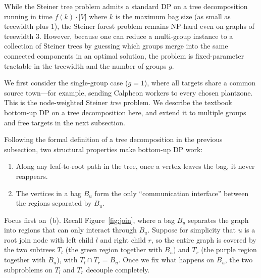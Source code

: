 \documentclass[11pt]{article}
\theoremstyle{definition}
\theoremstyle{remark}
\begin{document}
While the Steiner tree problem admits a standard DP on a tree decomposition running in time $f(k)\cdot |V|$ where $k$ is the maximum bag size (as small as treewidth plus $1$), the Steiner forest problem remains NP-hard even on graphs of treewidth $3$. However, because one can reduce a multi-group instance to a collection of Steiner trees by guessing which groups merge into the same connected components in an optimal solution, the problem is fixed-parameter tractable in the treewidth and the number of groups $g$.

We first consider the single-group case ($g = 1$), where all targets share a common source town---for example, sending Calpheon workers to every chosen plantzone. This is the node-weighted Steiner \textit{tree} problem. We describe the textbook bottom-up DP on a tree decomposition here, and extend it to multiple groups and free targets in the next subsection.

Following the formal definition of a tree decomposition in the previous subsection, two structural properties make bottom-up DP work:
\begin{enumerate}
    \item[(a)] Along any leaf-to-root path in the tree, once a vertex leaves the bag, it never reappears.
    \item[(b)] The vertices in a bag $B_u$ form the only ``communication interface'' between the regions separated by $B_u$.
\end{enumerate}

Focus first on~(b). Recall Figure~\ref{fig:join}, where a bag $B_u$ separates the graph into regions that can only interact through $B_u$. Suppose for simplicity that $u$ is a root join node with left child $l$ and right child $r$, so the entire graph is covered by the two subtrees $T_l$ (the green region together with $B_u$) and $T_r$ (the purple region together with $B_u$), with $T_l \cap T_r = B_u$. Once we fix what happens on $B_u$, the two subproblems on $T_l$ and $T_r$ decouple completely.
\end{document}
